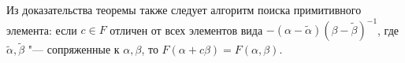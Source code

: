 \begin{note}
	Из доказательства теоремы также следует алгоритм поиска примитивного элемента: если $c \in F$ отличен от всех элементов вида $-(\alpha - \widetilde{\alpha})(\beta - \widetilde{\beta})^{-1}$, где $\widetilde{\alpha}, \widetilde{\beta}$ "--- сопряженные к $\alpha, \beta$, то $F(\alpha + c\beta) = F(\alpha, \beta)$.
\end{note}